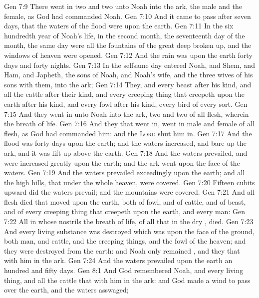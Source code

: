 \vs Gen 7:9 There went in two and two unto Noah into the ark, the male and the female, as God had commanded Noah.
\vs Gen 7:10 And it came to pass after seven days, that the waters of the flood were upon the earth.
\vs Gen 7:11 In the six hundredth year of Noah's life, in the second month, the seventeenth day of the month, the same day were all the fountains of the great deep broken up, and the windows of heaven were opened.
\vs Gen 7:12 And the rain was upon the earth forty days and forty nights.
\vs Gen 7:13 In the selfsame day entered Noah, and Shem, and Ham, and Japheth, the sons of Noah, and Noah's wife, and the three wives of his sons with them, into the ark;
\vs Gen 7:14 They, and every beast after his kind, and all the cattle after their kind, and every creeping thing that creepeth upon the earth after his kind, and every fowl after his kind, every bird of every sort.
\vs Gen 7:15 And they went in unto Noah into the ark, two and two of all flesh, wherein  the breath of life.
\vs Gen 7:16 And they that went in, went in male and female of all flesh, as God had commanded him: and the \textsc{Lord} shut him in.
\vs Gen 7:17 And the flood was forty days upon the earth; and the waters increased, and bare up the ark, and it was lift up above the earth.
\vs Gen 7:18 And the waters prevailed, and were increased greatly upon the earth; and the ark went upon the face of the waters.
\vs Gen 7:19 And the waters prevailed exceedingly upon the earth; and all the high hills, that  under the whole heaven, were covered.
\vs Gen 7:20 Fifteen cubits upward did the waters prevail; and the mountains were covered.
\vs Gen 7:21 And all flesh died that moved upon the earth, both of fowl, and of cattle, and of beast, and of every creeping thing that creepeth upon the earth, and every man:
\vs Gen 7:22 All in whose nostrils  the breath of life, of all that  in the dry , died.
\vs Gen 7:23 And every living substance was destroyed which was upon the face of the ground, both man, and cattle, and the creeping things, and the fowl of the heaven; and they were destroyed from the earth: and Noah only remained , and they that  with him in the ark.
\vs Gen 7:24 And the waters prevailed upon the earth an hundred and fifty days.
\vs Gen 8:1 And God remembered Noah, and every living thing, and all the cattle that  with him in the ark: and God made a wind to pass over the earth, and the waters asswaged;
